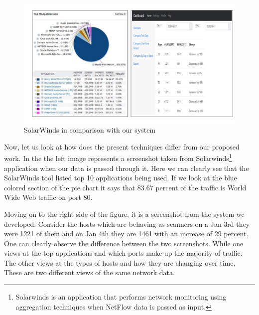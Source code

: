 \begin{figure}[b]
	\centerline{\includegraphics[scale = 0.5]{intro.pdf}}
	\caption{SolarWinds in comparison with our system}%
\end{figure}

Now, let us look at how does the present techniques differ from our proposed work. In the  the left image represents a screenshot taken from Solarwinds\footnote{Solarwinds is an application that performs network monitoring using aggregation techniques when NetFlow data is passed as input.} application when our data is passed through it. Here we can clearly see that the SolarWinds tool listed top 10 applications being used. If we look at the blue colored section of the pie chart it says that 83.67 percent of the traffic is World Wide Web traffic on port 80. 

Moving on to the right side of the figure, it is a screenshot from the system we developed. Consider the hosts which are behaving as scanners on a Jan 3rd they were 1221 of them and on Jan 4th they are 1461 with an increase of 29 percent. One can clearly observe the difference between the two screenshots. While one views at the top applications and which ports make up the majority of traffic. The other views at the types of hosts and how they are changing over time. These are two different views of the same network data.


